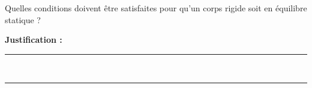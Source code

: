 Quelles conditions doivent être satisfaites pour qu'un corps rigide soit en équilibre statique ?

\choices

\noindent\textbf{Justification :} \hrulefill \\[2.5ex]
\rule{\linewidth}{0.4pt} \\[2.5ex]
\rule{\linewidth}{0.4pt}
\vfill
